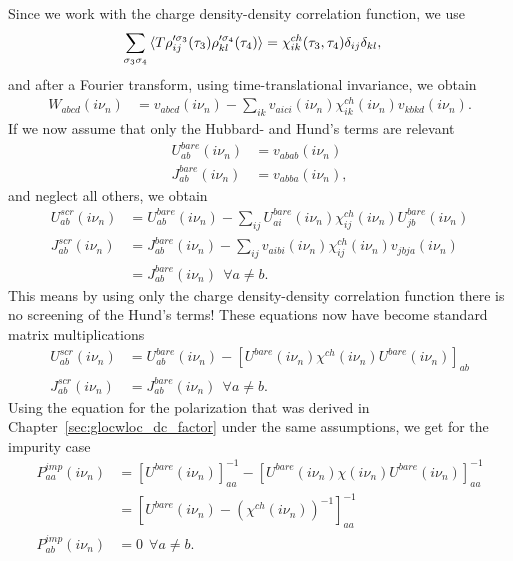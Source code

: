 \documentclass[12pt,a4paper]{scrartcl}
\numberwithin{equation}{section}
\begin{document}
Since we work with the charge density-density correlation function, we use
\begin{align}
\sum_{\sigma_3\sigma_4} \braket{T\rho'^{\sigma_3}_{ij}(\tau_3)\rho'^{\sigma_4}_{kl}(\tau_4)}
 &= \chi^{ch}_{ik}(\tau_3,\tau_4) \delta_{ij} \delta_{kl},
\end{align}
and after a Fourier transform, using time-translational invariance, we obtain
\begin{align}
W_{abcd}(i\nu_n) 
%
&= v_{abcd}(i\nu_n)  
- \sum_{ik} v_{aici}(i\nu_n)  \chi^{ch}_{ik}(i\nu_n)  v_{kbkd}(i\nu_n) .
\end{align}
If we now assume that only the Hubbard- and Hund's terms are relevant
\begin{align}
 U^{bare}_{ab}(i\nu_n) &= v_{abab}(i\nu_n) \\
 J^{bare}_{ab}(i\nu_n) &= v_{abba}(i\nu_n),
\end{align}
and neglect all others, we obtain
\begin{align}
U^{scr}_{ab}(i\nu_n) 
&= U^{bare}_{ab}(i\nu_n) - \sum_{ij} U^{bare}_{ai}(i\nu_n)  \chi^{ch}_{ij}(i\nu_n)  U^{bare}_{jb}(i\nu_n) \\
%
J^{scr}_{ab}(i\nu_n) 
&= J^{bare}_{ab}(i\nu_n) - \sum_{ij} v_{aibi}(i\nu_n)  \chi^{ch}_{ij}(i\nu_n)  v_{jbja}(i\nu_n) \nonumber \\
&= J^{bare}_{ab}(i\nu_n) \ \ \forall a\neq b.
\end{align}
This means by using only the charge density-density correlation function
there is no screening of the Hund's terms!
These equations now have become standard matrix multiplications
\begin{align}
U^{scr}_{ab}(i\nu_n) 
&= U^{bare}_{ab}(i\nu_n) - \left[ U^{bare}(i\nu_n)  \chi^{ch}(i\nu_n)  U^{bare}(i\nu_n) \right]_{ab} \\
%
J^{scr}_{ab}(i\nu_n) 
&= J^{bare}_{ab}(i\nu_n) \ \ \forall a\neq b.
\end{align}
Using the equation for the polarization that was derived in Chapter~\ref{sec:glocwloc_dc_factor}
under the same assumptions, we get for the impurity case
\begin{align}
 P^{imp}_{aa}(i\nu_n) &= \left[ U^{bare}(i\nu_n) \right]^{-1}_{aa} 
                           - \left[ U^{bare}(i\nu_n)\chi(i\nu_n)U^{bare}(i\nu_n) \right]^{-1}_{aa} \nonumber \\
                      &= \left[ U^{bare}(i\nu_n) - (\chi^{ch}(i\nu_n))^{-1} \right]^{-1}_{aa} \\
%
 P^{imp}_{ab}(i\nu_n) &= 0 \ \ \forall a\neq b.
\end{align}
\end{document}

